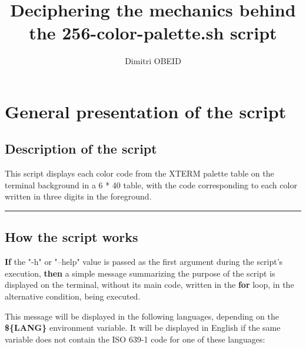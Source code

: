 \documentclass[a4paper,10pt]{article}
\title{\color{sec1}Deciphering the mechanics behind the \textbf{\color{sec2}256-color-palette.sh} script}\color{text}
\author{Dimitri OBEID}
\begin{document}
    \maketitle
    \newpage

    \hypertarget{contents}{}
    \tableofcontents
    \newpage

\color{sec1}
    \section{General presentation of the script}\color{text}

    \color{sec2}
    \subsection{Description of the script}\color{text}

    \begin{justify}
        This script displays each color code from the XTERM palette table on the terminal background in a 6 * 40 table, with the code corresponding to each color written in three digits in the foreground.
    \end{justify}




    \color{sec2}\par\noindent\rule{\textwidth}{0.4pt}\color{text}

    \color{sec2}
    \subsection{How the script works}\color{text}

    \begin{justify}
        \textbf{\color{cond}If} the "-h" or "--help" value is passed as the first argument during the script's execution, \textbf{\color{cond}then} a simple message summarizing the purpose of the script is displayed on the terminal, without its main code, written in the \textbf{\color{loop}for} loop, in the alternative condition, being executed.
    \end{justify}

    \begin{justify}
        This message will be displayed in the following languages, depending on the \textbf{\color{vars}\$\{LANG\}} environment variable. It will be displayed in English if the same variable does not contain the ISO 639-1 code for one of these languages:
    \end{justify}
\end{document}
